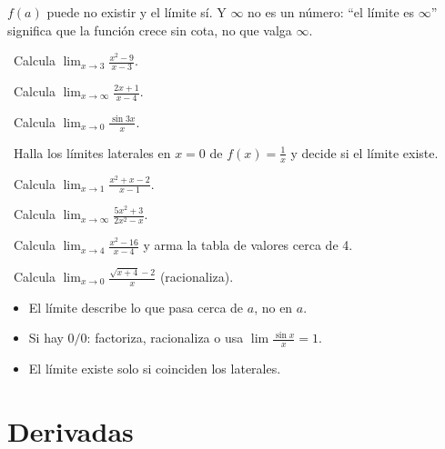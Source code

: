 \begin{tmcuidado}$f(a)$ puede no existir y el l\'imite s\'i. Y $\infty$ no es un n\'umero: ``el l\'imite es $\infty$'' significa que la funci\'on crece sin cota, no que valga $\infty$.\end{tmcuidado}

\begin{tmejercicios}
\label{ej:4-1}
\begin{tmlista}
\item \tmbasico\ Calcula $\lim_{x\to3}\frac{x^2-9}{x-3}$.
\item \tmbasico\ Calcula $\lim_{x\to\infty}\frac{2x+1}{x-4}$.
\item \tmbasico\ Calcula $\lim_{x\to0}\frac{\sin3x}{x}$.
\item \tmmedio\ Halla los l\'imites laterales en $x=0$ de $f(x)=\frac1x$ y decide si el l\'imite existe.
\item \tmmedio\ Calcula $\lim_{x\to1}\frac{x^2+x-2}{x-1}$.
\item \tmmedio\ Calcula $\lim_{x\to\infty}\frac{5x^2+3}{2x^2-x}$.
\item \tmdificil\ Calcula $\lim_{x\to4}\frac{x^2-16}{x-4}$ y arma la tabla de valores cerca de 4.
\item \tmdificil\ Calcula $\lim_{x\to0}\frac{\sqrt{x+4}-2}{x}$ (racionaliza).
\end{tmlista}
\end{tmejercicios}


\begin{tmresumen}
\begin{itemize}
\item El l\'imite describe lo que pasa cerca de $a$, no en $a$.
\item Si hay $0/0$: factoriza, racionaliza o usa $\lim\frac{\sin x}x=1$.
\item El l\'imite existe solo si coinciden los laterales.
\end{itemize}
\end{tmresumen}

\section{Derivadas}
\label{sec:4-2}

